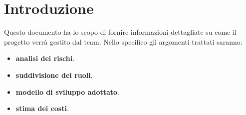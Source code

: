 \section{Introduzione}
\label{sec:introduzione}
Questo documento ha lo scopo di fornire informazioni dettagliate su come il progetto verrà gestito dal team.
Nello specifico gli argomenti trattati saranno:
\begin{itemize}
    \item \textbf{analisi dei rischi}.
    \item \textbf{suddivisione dei ruoli}.
    \item \textbf{modello di sviluppo adottato}.
    \item \textbf{stima dei costi}.
\end{itemize}